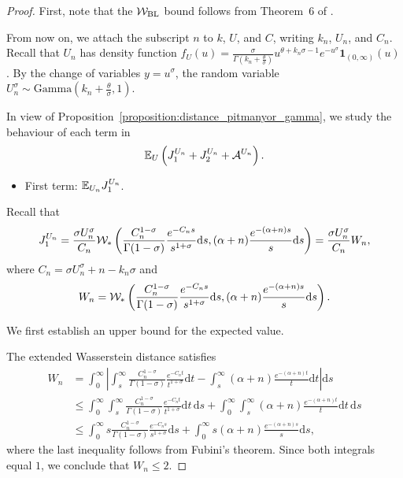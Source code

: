 \begin{proof}
    First, note that the $\mathcal{W}_{\mathrm{BL}}$ bound follows from Theorem~6 of \cite{catalano2026merging}.

    From now on, we attach the subscript $n$ to $k$, $U$, and $C$, writing $k_n$, $U_n$, and $C_n$. Recall that $U_n$ has density function $f_U(u) = \frac{\sigma}{\Gamma\left(k_n+\frac{\theta}{\sigma}\right)} u^{\theta + k_n\sigma - 1}e^{-u^\sigma}\mathbf{1}_{(0,\infty)}(u)$. By the change of variables $y = u^\sigma$, the random variable $U_n^\sigma \sim \mathrm{Gamma}\left(k_n + \frac{\theta}{\sigma}, 1\right)$.

    In view of Proposition~\ref{proposition:distance_pitmanyor_gamma}, we study the behaviour of each term in 
    \[
    \mathbb{E}_U\left(J_1^{U_n} + J_2^{U_n} + \mathcal{A}^{U_n}\right).
    \]
    \begin{itemize}
        \item First term: $\mathbb{E}_{U_n} J_1^{U_n}$.
    \end{itemize}
    Recall that
    \[
    J_1^{U_n} = \frac{ \sigma U_n^\sigma}{C_n}\mathcal{W}_*\left( \frac{C_n^{1-\sigma}}{\Gamma(1-\sigma)}\frac{e^{-C_ns}}{s^{1+\sigma}}\mathrm{d}s, (\alpha+n)\frac{e^{-(\alpha+n)s}}{s}\mathrm{d}s\right) =  \frac{ \sigma U_n^\sigma}{C_n} W_n,
    \]
    where $C_n = \sigma U_n^\sigma + n - k_n\sigma$ and
    \[
    W_n = \mathcal{W}_*\left( \frac{C_n^{1-\sigma}}{\Gamma(1-\sigma)}\frac{e^{-C_ns}}{s^{1+\sigma}}\mathrm{d}s, (\alpha+n)\frac{e^{-(\alpha+n)s}}{s} \mathrm{d}s\right).
    \]

    We first establish an upper bound for the expected value.

    The extended Wasserstein distance satisfies
    \begin{align*}
        W_n &=
        \int_0^\infty \left| \int_s^\infty \frac{C_n^{1-\sigma}}{\Gamma(1-\sigma)}\frac{e^{-C_nt}}{t^{1+\sigma}}\mathrm{d}t -
        \int_s^\infty (\alpha+n)\frac{e^{-(\alpha+n)t}}{t} \mathrm{d}t \right| \mathrm{d}s\\
        & \leq \int_0^\infty  \int_s^\infty \frac{C_n^{1-\sigma}}{\Gamma(1-\sigma)}\frac{e^{-C_nt}}{t^{1+\sigma}}\mathrm{d}t\,\mathrm{d}s +
        \int_0^\infty\int_s^\infty (\alpha+n)\frac{e^{-(\alpha+n)t}}{t} \mathrm{d}t\,\mathrm{d}s \\
        & \leq \int_0^\infty s \frac{C_n^{1-\sigma}}{\Gamma(1-\sigma)}\frac{e^{-C_ns}}{s^{1+\sigma}}\mathrm{d}s +
        \int_0^\infty s  (\alpha+n)\frac{e^{-(\alpha+n)s}}{s} \mathrm{d}s,
    \end{align*}
    where the last inequality follows from Fubini's theorem. Since both integrals equal $1$, we conclude that $W_n \leq 2$.


\end{proof}
